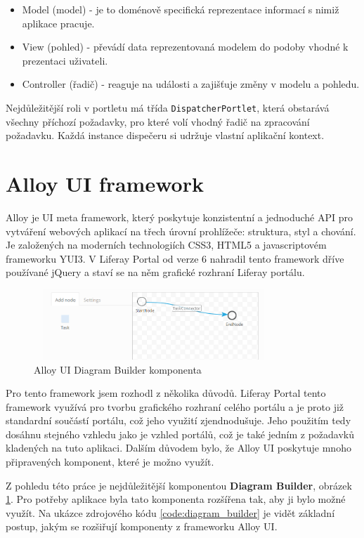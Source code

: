 \documentclass{fithesis}
\begin{document}
\begin{itemize}
\item Model (model) - je to doménově specifická reprezentace informací s nimiž aplikace pracuje.
\item View (pohled) - převádí data reprezentovaná modelem do podoby vhodné k prezentaci uživateli.
\item Controller (řadič) - reaguje na události a zajišťuje změny v modelu a pohledu.
\end{itemize}

Nejdůležitější roli v portletu má třída \verb|DispatcherPortlet|, která obstarává všechny příchozí požadavky, pro které volí vhodný řadič na zpracování požadavku. Každá instance dispečeru si udržuje vlastní aplikační kontext.


\section{Alloy UI framework}
Alloy je UI meta framework, který poskytuje konzistentní a jednoduché API pro vytváření webových aplikací na třech úrovní prohlížeče: struktura, styl a chování. Je založených na moderních technologiích CSS3, HTML5 a javascriptovém frameworku YUI3. \cite{alloy} V Liferay Portal od verze 6 nahradil tento framework dříve používané jQuery a staví se na něm grafické rozhraní Liferay portálu. 

\begin{figure}[htp]
\centering
\includegraphics[width=340px, height=100px]{images/diagram_builder.png}
\caption{Alloy UI Diagram Builder komponenta}
\label{fig:diagram_builder}
\end{figure}

Pro tento framework jsem rozhodl z několika důvodů. Liferay Portal tento framework využívá pro tvorbu grafického rozhraní celého portálu a je proto již standardní součástí portálu, což jeho využití zjendnodušuje. Jeho použitím tedy dosáhnu stejného vzhledu jako je vzhled portálů, což je také jedním z požadavků kladených na tuto aplikaci. Dalším důvodem bylo, že Alloy UI poskytuje mnoho připravených komponent, které je možno využít. 

Z pohledu této práce je nejdůležitější komponentou \textbf{Diagram Builder}, obrázek  \ref{fig:diagram_builder}. Pro potřeby aplikace byla tato komponenta rozšířena tak, aby ji bylo možné využít. Na ukázce zdrojového kódu \ref{code:diagram_builder} je vidět základní postup, jakým se rozšiřují komponenty z frameworku Alloy UI.
\end{document}
